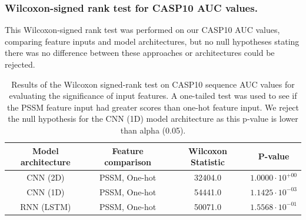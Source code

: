 \documentclass{l4proj}
\begin{document}
\begin{appendices}
\subsubsection{Wilcoxon-signed rank test for CASP10 AUC values.}
\label{chap:appendix sec:casp10auc}
This Wilcoxon-signed rank test was performed on our CASP10 AUC values, comparing feature inputs and model architectures, but no null hypotheses stating there was no difference between these approaches or architectures could be rejected.

\begin{table}[!h]
    \centering
    \caption{Results of the Wilcoxon signed-rank test on CASP10 sequence AUC values for evaluating the significance of input features. A one-tailed test was used to see if the PSSM feature input had greater scores than one-hot feature input. We reject the null hypothesis for the CNN (1D) model architecture as this p-value is lower than alpha (0.05).}
    \begin{tabular}{@{}cccc@{}}
    \toprule
    Model architecture & Feature comparison & Wilcoxon Statistic & P-value \\ \midrule
    CNN (2D) & PSSM, One-hot & 32404.0 & $1.0000\cdot{10^{+00}}$ \\
    CNN (1D) & PSSM, One-hot & 54441.0 & $1.1425\cdot{10^{-03}}$ \\
    RNN (LSTM) & PSSM, One-hot & 50071.0 & $1.5568\cdot{10^{-01}}$ \\ \bottomrule
    \end{tabular}
    
    \label{tab:auccaspwilcinput}
\end{table}


\end{appendices}
\end{document}
